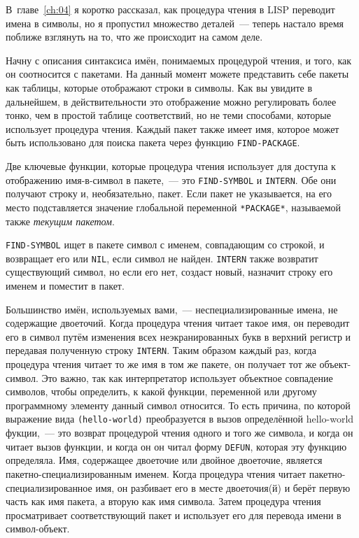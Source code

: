 В~главе~\ref{ch:04} я коротко рассказал, как процедура чтения в LISP переводит имена в символы,
но я пропустил множество деталей~--- теперь настало время поближе взглянуть на то, что же
происходит на самом деле.

Начну с описания синтаксиса имён, понимаемых процедурой чтения, и того, как он соотносится с
пакетами.  На данный момент можете представить себе пакеты как таблицы, которые
отображают строки в символы. Как вы увидите в дальнейшем, в действительности это
отображение можно регулировать более тонко, чем в простой таблице соответствий, но не теми
способами, которые использует процедура чтения. Каждый пакет также имеет имя, которое может
быть использовано для поиска пакета через функцию \lstinline{FIND-PACKAGE}.

Две ключевые функции, которые процедура чтения использует для доступа к отображению
имя-в-символ в пакете,~--- это \lstinline{FIND-SYMBOL} и \lstinline{INTERN}. Обе они получают строку и,
необязательно, пакет.  Если пакет не указывается, на его место подставляется значение
глобальной переменной \lstinline{*PACKAGE*}, называемой также \textit{текущим пакетом}.

\lstinline{FIND-SYMBOL} ищет в пакете символ с именем, совпадающим со строкой, и возвращает его
или \lstinline{NIL}, если символ не найден. \lstinline{INTERN} также возвратит существующий символ,
но если его нет, создаст новый, назначит строку его именем и поместит в пакет.

Большинство имён, используемых вами,~--- неспециализированные имена, не содержащие
двоеточий. Когда процедура чтения читает такое имя, он переводит его в символ путём изменения
всех неэкранированных букв в верхний регистр и передавая полученную строку \lstinline{INTERN}.
Таким образом каждый раз, когда процедура чтения читает то же имя в том же пакете, он получает
тот же объект-символ. Это важно, так как интерпретатор использует объектное совпадение
символов, чтобы определить, к какой функции, переменной или другому программному элементу
данный символ относится. То есть причина, по которой выражение вида \lstinline{(hello-world)}
преобразуется в вызов определённой hello-world фукции,~--- это возврат процедурой чтения одного и
того же символа, и когда он читает вызов функции, и когда он он читал форму \lstinline{DEFUN},
которая эту функцию определяла.  Имя, содержащее двоеточие или двойное двоеточие, является
пакетно-специализированным именем. Когда процедура чтения читает пакетно-специализированное
имя, он разбивает его в месте двоеточия(й) и берёт первую часть как имя пакета, а вторую
как имя символа.  Затем процедура чтения просматривает соответствующий пакет и использует его
для перевода имени в символ-объект.

